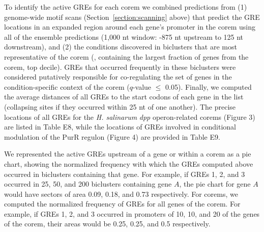 To identify the active GREs for each corem we combined predictions
from (1) genome-wide motif scans (Section~\ref{section:scanning}
above) that predict the GRE locations in an expanded region around
each gene’s promoter in the corem using all of the ensemble
predictions (1,000 nt window: -875 nt upstream to 125 nt downstream),
and (2) the conditions discovered in biclusters that are most
representative of the corem (\ie, containing the largest fraction of
genes from the corem, top decile). GREs that occurred frequently
in these biclusters were considered putatively responsible for
co-regulating the set of genes in the condition-specific context of
the corem ($q$-value $\leq$ 0.05). Finally, we computed the average distances
of all GREs to the start codons of each gene in the list (collapsing
sites if they occurred within 25 nt of one another). The precise
locations of all GREs for the {\it H. salinarum} \textit{dpp} operon-related
corems (Figure 3) are listed in Table E8, while the locations of GREs
involved in conditional modulation of the PurR regulon (Figure 4) are
provided in Table E9.

We represented the active GREs upstream of a gene or within a corem as
a pie chart, showing the normalized frequency with which the GREs
computed above occurred in biclusters containing that gene. For
example, if GREs 1, 2, and 3 occurred in 25, 50, and 200 biclusters
containing gene $A$, the pie chart for gene $A$ would have sectors of area
0.09, 0.18, and 0.73 respectively. For corems, we computed the
normalized frequency of GREs for all genes of the corem. For example,
if GREs 1, 2, and 3 occurred in promoters of 10, 10, and 20 of the
genes of the corem, their areas would be 0.25, 0.25, and 0.5
respectively.

